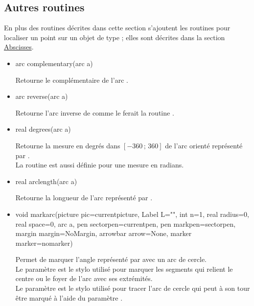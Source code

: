 \documentclass[pdftex]{article}
\begin{document}
\subsection{Autres routines}
En plus des routines décrites dans cette section
s'ajoutent les routines pour localiser un point sur un objet de type
; elles sont décrites dans la section
\href{#section.abscissa}{Abscisses}.
\begin{itemize}
\item {}
  \begin{Vcolor}
    arc complementary(arc a)
  \end{Vcolor}
  Retourne le complémentaire de l'arc .
\item {}
  \begin{Vcolor}
    arc reverse(arc a)
  \end{Vcolor}
  Retourne l'arc inverse de  comme le ferait la routine
  .
\item {}
  \begin{Vcolor}
    real degrees(arc a)
  \end{Vcolor}
  Retourne la mesure en degrés dans $\left[-360\,;\,360\right]$ de
  l'arc orienté représenté par .\\
  La routine  est aussi définie pour une mesure en
  radians.
\item {}
  \begin{Vcolor}
    real arclength(arc a)
  \end{Vcolor}
  Retourne la longueur de l'arc représenté par .
\item {}
  \begin{Vcolor}
    void markarc(picture pic=currentpicture,
    Label L="", int n=1, real radius=0, real space=0,
    arc a, pen sectorpen=currentpen, pen markpen=sectorpen,
    margin margin=NoMargin, arrowbar arrow=None, marker marker=nomarker)
  \end{Vcolor}
  Permet de marquer l'angle représenté par  avec un arc de
  cercle.\\
  Le paramètre  est le stylo utilisé pour
  marquer les segments qui relient le centre ou le foyer de l'arc avec
  ses extrémités.\\
  Le paramètre  est le stylo utilisé pour tracer l'arc
  de cercle qui peut à son tour être marqué à l'aide du
  paramètre .\\

\end{itemize}
\end{document}
